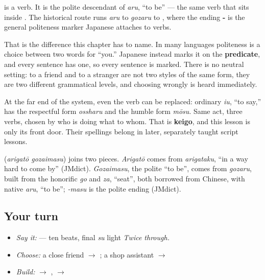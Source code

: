 \begin{grammarlens}[title={Grammar Lens — politeness is grammar here, not word choice}]
\textbf{} is a verb. It is the polite descendant of \emph{aru}, \textquotedblleft{}to be\textquotedblright{} — the same verb that sits inside \textbf{}. The historical route runs \emph{aru} to \emph{gozaru} to \textbf{}, where the ending \textbf{-} is the general politeness marker Japanese attaches to verbs.

That is the difference this chapter has to name. In many languages politeness is a choice between two words for \textquotedblleft{}you.\textquotedblright{} Japanese instead marks it on the \textbf{predicate}, and every sentence has one, so every sentence is marked. There is no neutral setting: \textbf{} to a friend and \textbf{} to a stranger are not two styles of the same form, they are two different grammatical levels, and choosing wrongly is heard immediately.

At the far end of the system, even the verb can be replaced: ordinary \emph{iu}, \textquotedblleft{}to say,\textquotedblright{} has the respectful form \emph{ossharu} and the humble form \emph{mōsu}. Same act, three verbs, chosen by who is doing what to whom. That is \textbf{keigo}, and this lesson is only its front door. Their spellings belong in later, separately taught script lessons.
\end{grammarlens}

\begin{cousinweb}
\textbf{} (\emph{arigatō gozaimasu}) joins two pieces. \emph{Arigatō} comes from \emph{arigataku}, \textquotedblleft{}in a way hard to come by\textquotedblright{} (JMdict). \emph{Gozaimasu}, the polite \textquotedblleft{}to be\textquotedblright{}, comes from \emph{gozaru}, built from the honorific \emph{go} and \emph{za}, \textquotedblleft{}seat\textquotedblright{}, both borrowed from Chinese, with native \emph{aru}, \textquotedblleft{}to be\textquotedblright{}; \emph{-masu} is the polite ending (JMdict).
\end{cousinweb}

\subsection*{Your turn}
\begin{itemize}
\raggedright
  \item \emph{Say it:} \textbf{} — ten beats, final \emph{su} light \emph{Twice through.}
  \item \emph{Choose:} a close friend $\to$ \textbf{}; a shop assistant $\to$ \textbf{}
  \item \emph{Build:} \textbf{} $\to$ \textbf{}, \textbf{} $\to$ \textbf{}
\end{itemize}

